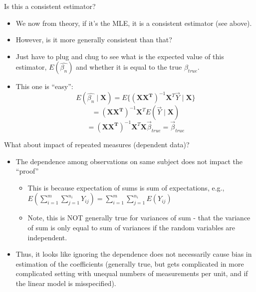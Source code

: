 \documentclass[ignorenonframetext,]{beamer}
\providecommand{\tightlist}{%
  \setlength{\itemsep}{0pt}\setlength{\parskip}{0pt}}
\begin{document}
\begin{frame}{Is this a consistent estimator?}

\begin{itemize}
\tightlist
\item
  We now from theory, if it's the MLE, it is a consistent estimator (see
  above).
\item
  However, is it more generally consistent than that?
\item
  Just have to plug and chug to see what is the expected value of this
  estimator, \(E(\hat{\beta_n})\) and whether it is equal to the true
  \(\beta_{true}\).\\
\item
  This one is ``easy'':
  \[E(\hat{\beta_n}\mid \boldsymbol{X})=E\{ \boldsymbol{(X X^T) }^{-1} \boldsymbol{X}^T \vec{Y} \mid \boldsymbol{X} \} \]
  \[=
  \boldsymbol{(X X^T) }^{-1} \boldsymbol{X}^T E(\vec{Y} \mid \boldsymbol{X}) \]
  \[ = \boldsymbol{(X X^T) }^{-1} \boldsymbol{X}^T  \boldsymbol{X} \vec{\beta}_{true} = \vec{\beta}_{true}\]
\end{itemize}

\end{frame}

\begin{frame}{What about impact of repeated measures (dependent data)?}

\begin{itemize}
\tightlist
\item
  The dependence among observations on same subject does not impact the
  ``proof''

  \begin{itemize}
  \tightlist
  \item
    This is because expectation of sums is sum of expectations, e.g.,
    \(E(\sum_{i=1}^m \sum_{j=1}^{n_i} Y_{ij}) = \sum_{i=1}^m \sum_{j=1}^{n_i} E(Y_{ij})\)
  \item
    Note, this is NOT generally true for variances of sum - that the
    variance of sum is only equal to sum of variances if the random
    variables are independent.
  \end{itemize}
\item
  Thus, it looks like ignoring the dependence does not necessarily cause
  bias in estimation of the coefficients (generally true, but gets
  complicated in more complicated setting with unequal numbers of
  measurements per unit, and if the linear model is misspecified).
\end{itemize}

\end{frame}
\end{document}
